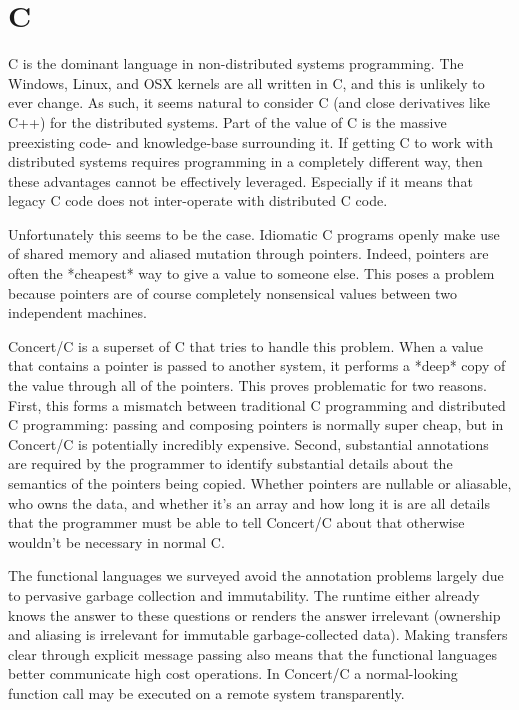 \documentclass[10pt,a4paper,twocolumn]{article}
\begin{document}
\section{C}

C is the dominant language in non-distributed systems programming. The Windows,
Linux, and OSX kernels are all written in C, and this is unlikely to ever
change. As such, it seems natural to consider C (and close derivatives like C++)
for the distributed systems. Part of the value of C is the massive preexisting
code- and knowledge-base surrounding it. If getting C to work with distributed
systems requires programming in a completely different way, then these
advantages cannot be effectively leveraged. Especially if it means that legacy C
code does not inter-operate with distributed C code.

Unfortunately this seems to be the case. Idiomatic C programs openly make use of
shared memory and aliased mutation through pointers. Indeed, pointers are often
the *cheapest* way to give a value to someone else. This poses a problem because
pointers are of course completely nonsensical values between two independent
machines.

Concert/C \cite{auerbach1994concert} is a superset of C that tries to handle
this problem. When a value that contains a pointer is passed to another system,
it performs a *deep* copy of the value through all of the pointers. This proves
problematic for two reasons. First, this forms a mismatch between traditional C
programming and distributed C programming: passing and composing pointers is
normally super cheap, but in Concert/C is potentially incredibly expensive.
Second, substantial annotations are required by the programmer to identify
substantial details about the semantics of the pointers being copied. Whether
pointers are nullable or aliasable, who owns the data, and whether it's an array
and how long it is are all details that the programmer must be able to tell
Concert/C about that otherwise wouldn't be necessary in normal C.

The functional languages we surveyed avoid the annotation problems largely due
to pervasive garbage collection and immutability. The runtime either already
knows the answer to these questions or renders the answer irrelevant (ownership
and aliasing is irrelevant for immutable garbage-collected data). Making
transfers clear through explicit message passing also means that the functional
languages better communicate high cost operations. In Concert/C a normal-looking
function call may be executed on a remote system transparently.
\end{document}
